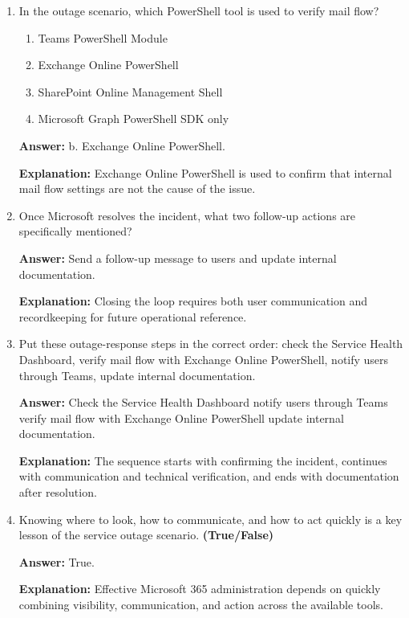 \documentclass[10pt]{article}
\begin{document}
\begin{enumerate}[leftmargin=*]
\textbf{Explanation:} The response combines monitoring, communication, and ongoing tracking of Microsoft’s remediation progress.

\item In the outage scenario, which PowerShell tool is used to verify mail flow?
\begin{enumerate}[label=\alph*., leftmargin=1.5em]
\item Teams PowerShell Module
\item Exchange Online PowerShell
\item SharePoint Online Management Shell
\item Microsoft Graph PowerShell SDK only
\end{enumerate}
\textbf{Answer:} b. Exchange Online PowerShell.

\textbf{Explanation:} Exchange Online PowerShell is used to confirm that internal mail flow settings are not the cause of the issue.

\item Once Microsoft resolves the incident, what two follow-up actions are specifically mentioned?

\textbf{Answer:} Send a follow-up message to users and update internal documentation.

\textbf{Explanation:} Closing the loop requires both user communication and recordkeeping for future operational reference.

\item Put these outage-response steps in the correct order: check the Service Health Dashboard, verify mail flow with Exchange Online PowerShell, notify users through Teams, update internal documentation.

\textbf{Answer:} Check the Service Health Dashboard \textrightarrow{} notify users through Teams \textrightarrow{} verify mail flow with Exchange Online PowerShell \textrightarrow{} update internal documentation.

\textbf{Explanation:} The sequence starts with confirming the incident, continues with communication and technical verification, and ends with documentation after resolution.

\item Knowing where to look, how to communicate, and how to act quickly is a key lesson of the service outage scenario. \textbf{(True/False)}

\textbf{Answer:} True.

\textbf{Explanation:} Effective Microsoft 365 administration depends on quickly combining visibility, communication, and action across the available tools.

\end{enumerate}
\end{document}
